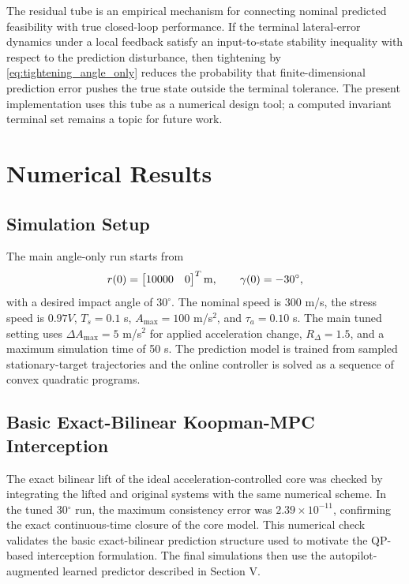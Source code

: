 \documentclass[letterpaper,journal]{IEEEtran}
\begin{document}
The residual tube is an empirical mechanism for connecting nominal predicted feasibility with true closed-loop performance. If the terminal lateral-error dynamics under a local feedback satisfy an input-to-state stability inequality with respect to the prediction disturbance, then tightening by \eqref{eq:tightening_angle_only} reduces the probability that finite-dimensional prediction error pushes the true state outside the terminal tolerance. The present implementation uses this tube as a numerical design tool; a computed invariant terminal set remains a topic for future work.

\section{Numerical Results}

\subsection{Simulation Setup}
The main angle-only run starts from
\begin{equation}
    r(0)=
    \begin{bmatrix}
    10000&0
    \end{bmatrix}^T{\rm m},\qquad
    \gamma(0)=-30^\circ ,
\end{equation}
with a desired impact angle of $30^\circ$. The nominal speed is $300$ m/s, the stress speed is $0.97V$, $T_s=0.1$ s, $A_{\max}=100$ m/s$^2$, and $\tau_a=0.10$ s. The main tuned setting uses $\Delta A_{\max}=5$ m/s$^2$ for applied acceleration change, $R_\Delta=1.5$, and a maximum simulation time of 50 s. The prediction model is trained from sampled stationary-target trajectories and the online controller is solved as a sequence of convex quadratic programs.

\subsection{Basic Exact-Bilinear Koopman-MPC Interception}
The exact bilinear lift of the ideal acceleration-controlled core was checked by integrating the lifted and original systems with the same numerical scheme. In the tuned 30$^\circ$ run, the maximum consistency error was $2.39\times10^{-11}$, confirming the exact continuous-time closure of the core model. This numerical check validates the basic exact-bilinear prediction structure used to motivate the QP-based interception formulation. The final simulations then use the autopilot-augmented learned predictor described in Section V.
\end{document}
